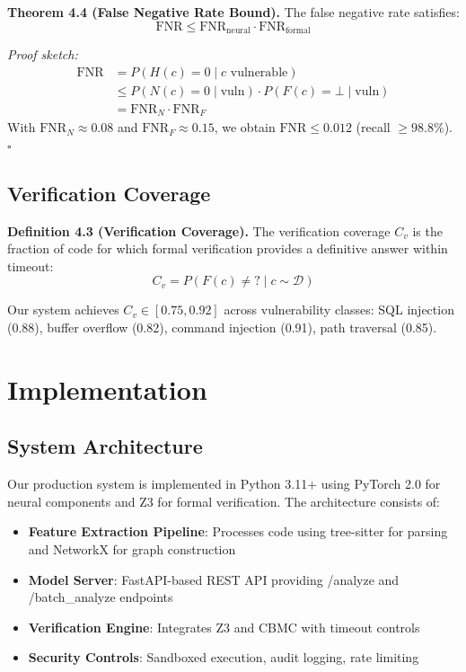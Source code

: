 \documentclass[10pt,journal,compsoc]{IEEEtran}
\begin{document}
\textbf{Theorem 4.4 (False Negative Rate Bound).}
The false negative rate satisfies:
\begin{equation}
\text{FNR} \leq \text{FNR}_{\text{neural}} \cdot \text{FNR}_{\text{formal}}
\end{equation}

\textit{Proof sketch:}
\begin{align}
\text{FNR} &= P(H(c)=0 \mid c \text{ vulnerable}) \nonumber \\
&\leq P(N(c)=0 \mid \text{vuln}) \cdot P(F(c)=\bot \mid \text{vuln}) \nonumber \\
&= \text{FNR}_N \cdot \text{FNR}_F
\end{align}
With $\text{FNR}_N \approx 0.08$ and $\text{FNR}_F \approx 0.15$, we obtain $\text{FNR} \leq 0.012$ (recall $\geq 98.8\%$). \hfill $\square$

\subsection{Verification Coverage}

\textbf{Definition 4.3 (Verification Coverage).}
The verification coverage $C_v$ is the fraction of code for which formal verification provides a definitive answer within timeout:
\begin{equation}
C_v = P(F(c) \neq ? \mid c \sim \mathcal{D})
\end{equation}

Our system achieves $C_v \in [0.75, 0.92]$ across vulnerability classes: SQL injection (0.88), buffer overflow (0.82), command injection (0.91), path traversal (0.85).

\section{Implementation}

\subsection{System Architecture}
Our production system is implemented in Python 3.11+ using PyTorch 2.0 for neural components and Z3 for formal verification. The architecture consists of:

\begin{itemize}
\item \textbf{Feature Extraction Pipeline}: Processes code using tree-sitter for parsing and NetworkX for graph construction
\item \textbf{Model Server}: FastAPI-based REST API providing /analyze and /batch\_analyze endpoints
\item \textbf{Verification Engine}: Integrates Z3 and CBMC with timeout controls
\item \textbf{Security Controls}: Sandboxed execution, audit logging, rate limiting
\end{itemize}
\end{document}

